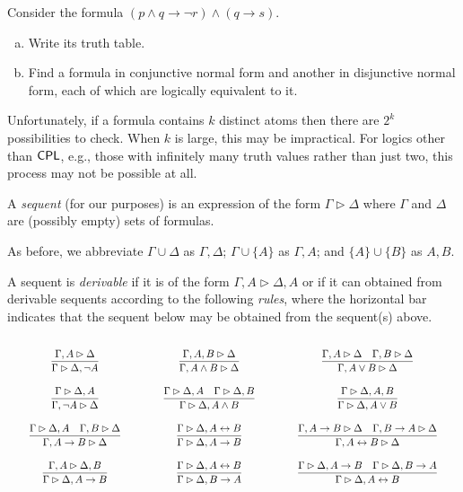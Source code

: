 \documentclass{article}
\begin{document}
\begin{prob}{3.1}
    Consider the formula $(p \wedge q \to \neg r) \wedge (q \to s)$.
    \begin{enumerate}[a)]
        \item Write its truth table.
        \item Find a formula in conjunctive normal form and another in disjunctive normal form, each of which are logically equivalent to it.
    \end{enumerate}
\end{prob}

Unfortunately, if a formula contains $k$ distinct atoms then there are $2^k$ possibilities to check. When $k$ is large, this may be impractical. For logics other than $\mathsf{CPL}$, e.g., those with infinitely many truth values rather than just two, this process may not be possible at all.

\begin{definition}
    A \emph{sequent} (for our purposes) is an expression of the form $\Gamma \rhd \Delta$ where $\Gamma$ and $\Delta$ are (possibly empty) sets of formulas.
\end{definition}

\begin{notation} 
    As before, we abbreviate $\Gamma \cup \Delta$ as $\Gamma, \Delta$; $\Gamma \cup \{ A \}$ as $\Gamma, A$; and $\{ A \} \cup \{ B \}$ as $A, B$.
\end{notation}

\begin{definition}
    A sequent is \emph{derivable} if it is of the form $\Gamma, A \rhd \Delta, A$ or if it can obtained from derivable sequents according to the following \emph{rules}, where the horizontal bar indicates that the sequent below may be obtained from the sequent(s) above.
\end{definition}

\[ \arraycolsep = 2em \def\arraystretch{3}
\begin{array}{c c c c c c c}
\sequent{\Gamma, A}{\Delta}{\Gamma}{\Delta, \neg A} &
\sequent{\Gamma, A, B}{\Delta}{\Gamma, A \wedge B}{\Delta} &
\doublesequent{\Gamma, A}{\Delta}{\Gamma, B}{\Delta}{\Gamma, A \vee B}{\Delta} 
\\
\sequent{\Gamma}{\Delta, A}{\Gamma, \neg A}{\Delta} &
\doublesequent{\Gamma}{\Delta, A}{\Gamma}{\Delta, B}{\Gamma}{\Delta, A \wedge B} &
\sequent{\Gamma}{\Delta, A, B}{\Gamma}{\Delta, A \vee B}
\\
\doublesequent{\Gamma}{\Delta, A}{\Gamma, B}{\Delta}{\Gamma, A \to B}{\Delta} &
\sequent{\Gamma}{\Delta, A \iff B}{\Gamma}{\Delta, A \to B} &
\doublesequent{\Gamma, A \to B}{\Delta}{\Gamma, B \to A}{\Delta}{\Gamma, A \iff B}{\Delta}
\\
\sequent{\Gamma, A}{\Delta, B}{\Gamma}{\Delta, A \to B} &
\sequent{\Gamma}{\Delta, A \iff B}{\Gamma}{\Delta, B \to A} &
\doublesequent{\Gamma}{\Delta, A \to B}{\Gamma}{\Delta, B \to A}{\Gamma}{\Delta, A \iff B}
\end{array}
\]
\end{document}
